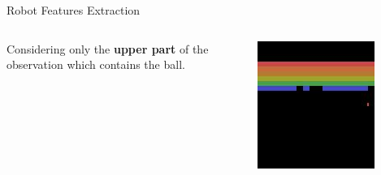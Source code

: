 \begin{frame}{Robot Features Extraction}
    \begin{columns}[c,onlytextwidth]
            \parbox{0.95\textwidth}{
                Considering only the \textbf{upper part} of the\\
                observation which contains the ball.}
            \begin{figure}
                \includegraphics[width=\textwidth]{images/robotfeaturesextractorsequence/robotfeatures-upper-part.jpg}
            \end{figure}
    \end{columns}
\end{frame}

